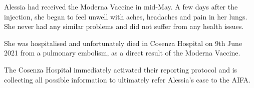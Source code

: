 Alessia had received the Moderna Vaccine in mid-May. A few days after the
injection, she began to feel unwell with aches, headaches and pain in her
lungs. She never had any similar problems and did not suffer from any health
issues.

She was hospitalised and unfortunately died in Cosenza Hospital on 9th June 2021
from a pulmonary embolism, as a direct result of the Moderna Vaccine.

The Cosenza Hospital immediately activated their reporting protocol and is
collecting all possible information to ultimately refer Alessia’s case to the
AIFA.

